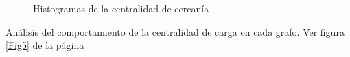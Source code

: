 \documentclass{article}
\begin{document}
\begin{figure}[htbp]
\caption{Histogramas de la centralidad de cercanía}
\label{Fig4} 
\end{figure}

Análisis del comportamiento de la centralidad de carga en cada grafo. Ver figura \ref{Fig5} de la página \pageref{Fig5} 
\end{document}

